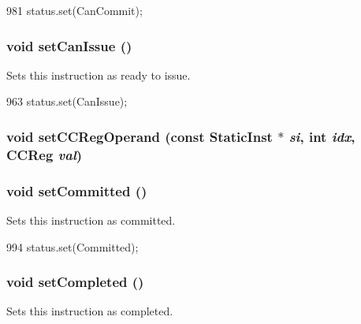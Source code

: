 \begin{DoxyCode}
981 { status.set(CanCommit); }
\end{DoxyCode}
\hypertarget{classInOrderDynInst_a2531049d5481976af68c8586015f0047}{
\subsubsection[{setCanIssue}]{\setlength{\rightskip}{0pt plus 5cm}void setCanIssue ()}}
\label{classInOrderDynInst_a2531049d5481976af68c8586015f0047}
Sets this instruction as ready to issue. 


\begin{DoxyCode}
963 { status.set(CanIssue); }
\end{DoxyCode}
\hypertarget{classInOrderDynInst_a859133f9c66c7b72cb02ff58e8385b52}{
\subsubsection[{setCCRegOperand}]{\setlength{\rightskip}{0pt plus 5cm}void setCCRegOperand (const {\bf StaticInst} $\ast$ {\em si}, \/  int {\em idx}, \/  {\bf CCReg} {\em val})}}
\label{classInOrderDynInst_a859133f9c66c7b72cb02ff58e8385b52}
\hypertarget{classInOrderDynInst_a101a00eca65e94adc1377989d88a3c99}{
\subsubsection[{setCommitted}]{\setlength{\rightskip}{0pt plus 5cm}void setCommitted ()}}
\label{classInOrderDynInst_a101a00eca65e94adc1377989d88a3c99}
Sets this instruction as committed. 


\begin{DoxyCode}
994 { status.set(Committed); }
\end{DoxyCode}
\hypertarget{classInOrderDynInst_a3241c8bad3d5ddb517721b999a4e3670}{
\subsubsection[{setCompleted}]{\setlength{\rightskip}{0pt plus 5cm}void setCompleted ()}}
\label{classInOrderDynInst_a3241c8bad3d5ddb517721b999a4e3670}
Sets this instruction as completed. 


